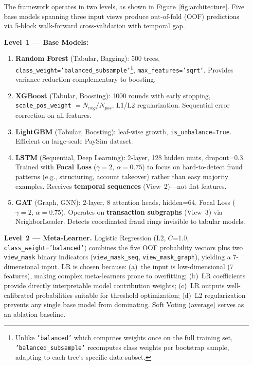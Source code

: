 \documentclass[10pt,a4paper,twocolumn]{article}
\begin{document}
The framework operates in two levels, as shown in Figure~\ref{fig:architecture}. Five base models spanning three input views produce out-of-fold (OOF) predictions via 5-block walk-forward cross-validation with temporal gap.

\textbf{Level~1 --- Base Models:}

\begin{enumerate}
    \item \textbf{Random Forest} \cite{breiman2001} (Tabular, Bagging): 500 trees, \texttt{class\_weight='balanced\_subsample'}\footnote{Unlike \texttt{'balanced'} which computes weights once on the full training set, \texttt{'balanced\_subsample'} recomputes class weights per bootstrap sample, adapting to each tree's specific data subset.}, \texttt{max\_features='sqrt'}. Provides variance reduction complementary to boosting.
    \item \textbf{XGBoost} \cite{chen2016} (Tabular, Boosting): 1000 rounds with early stopping, \texttt{scale\_pos\_weight} $= N_{neg}/N_{pos}$, L1/L2 regularization. Sequential error correction on all features.
    \item \textbf{LightGBM} \cite{ke2017} (Tabular, Boosting): leaf-wise growth, \texttt{is\_unbalance=True}. Efficient on large-scale PaySim dataset.
    \item \textbf{LSTM} (Sequential, Deep Learning): 2-layer, 128 hidden units, dropout=0.3. Trained with \textbf{Focal Loss} \cite{lin2017} ($\gamma{=}2$, $\alpha{=}0.75$) to focus on hard-to-detect fraud patterns (e.g., structuring, account takeover) rather than easy majority examples. Receives \textbf{temporal sequences} (View~2)---not flat features.
    \item \textbf{GAT} \cite{velickovic2018} (Graph, GNN): 2-layer, 8 attention heads, hidden=64. Focal Loss ($\gamma{=}2$, $\alpha{=}0.75$). Operates on \textbf{transaction subgraphs} (View~3) via NeighborLoader. Detects coordinated fraud rings invisible to tabular models.
\end{enumerate}

\textbf{Level~2 --- Meta-Learner.} Logistic Regression (L2, $C$=1.0, \texttt{class\_weight='balanced'}) combines the five OOF probability vectors plus two \texttt{view\_mask} binary indicators (\texttt{view\_mask\_seq}, \texttt{view\_mask\_graph}), yielding a 7-dimensional input. LR is chosen because: (a)~the input is low-dimensional (7 features), making complex meta-learners prone to overfitting; (b)~LR coefficients provide directly interpretable model contribution weights; (c)~LR outputs well-calibrated probabilities suitable for threshold optimization; (d)~L2 regularization prevents any single base model from dominating. Soft Voting (average) serves as an ablation baseline.
\end{document}
